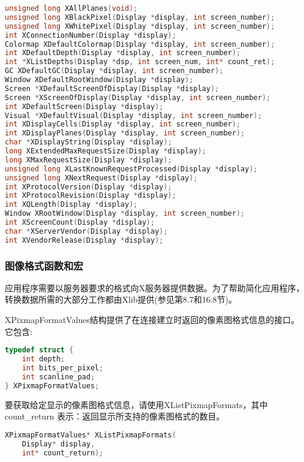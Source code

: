 \begin{lstlisting}[language=C]
unsigned long XAllPlanes(void);
unsigned long XBlackPixel(Display *display, int screen_number);
unsigned long XWhitePixel(Display *display, int screen_number);
int XConnectionNumber(Display *display);
Colormap XDefaultColormap(Display *display, int screen_number);
int XDefaultDepth(Display *display, int screen_number);
int *XListDepths(Display *dsp, int screen_num, int* count_ret);
GC XDefaultGC(Display *display, int screen_number);
Window XDefaultRootWindow(Display *display);
Screen *XDefaultScreenOfDisplay(Display *display);
Screen *XScreenOfDisplay(Display *display, int screen_number);
int XDefaultScreen(Display *display);
Visual *XDefaultVisual(Display *display, int screen_number);
int XDisplayCells(Display *display, int screen_number);
int XDisplayPlanes(Display *display, int screen_number);
char *XDisplayString(Display *display);
long XExtendedMaxRequestSize(Display *display);
long XMaxRequestSize(Display *display);
unsigned long XLastKnownRequestProcessed(Display *display);
unsigned long XNextRequest(Display *display);
int XProtocolVersion(Display *display);
int XProtocolRevision(Display *display);
int XQLength(Display *display);
Window XRootWindow(Display *display, int screen_number);
int XScreenCount(Display *display);
char *XServerVendor(Display *display);
int XVendorRelease(Display *display);
\end{lstlisting}

\subsubsection{图像格式函数和宏}

应用程序需要以服务器要求的格式向X服务器提供数据。为了帮助简化应用程序，转换数据所需的大部分工作都由Xlib提供(参见第8.7和16.8节)。

XPixmapFormatValues结构提供了在连接建立时返回的像素图格式信息的接口。它包含:

\begin{lstlisting}[language=C]
typedef struct {
	int depth;
	int bits_per_pixel;
	int scanline_pad;
} XPixmapFormatValues;
\end{lstlisting}

\noindent 要获取给定显示的像素图格式信息，请使用XListPixmapFormats，其中 count\_return 表示：返回显示所支持的像素图格式的数目。

\begin{lstlisting}[language=C]
XPixmapFormatValues* XListPixmapFormats(
	Display* display,
	int* count_return);
\end{lstlisting}

